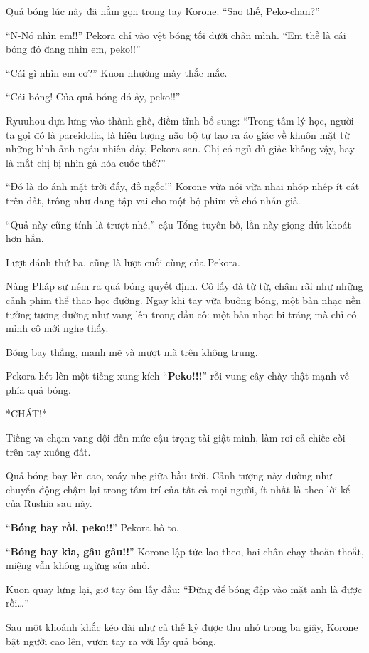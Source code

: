 \documentclass[../main.tex]{subfiles}
\begin{document}
Quả bóng lúc này đã nằm gọn trong tay Korone. ``Sao thế, Peko-chan?''

``N-Nó nhìn em!!'' Pekora chỉ vào vệt bóng tối dưới chân mình. ``Em thề là cái bóng đó đang nhìn em, peko!!''

``Cái gì nhìn em cơ?'' Kuon nhướng mày thắc mắc.

``Cái bóng! Của quả bóng đó ấy, peko!!''

Ryuuhou dựa lưng vào thành ghế, điềm tĩnh bổ sung: ``Trong tâm lý học, người ta gọi đó là pareidolia, là hiện tượng não bộ tự tạo ra ảo giác về khuôn mặt từ những hình ảnh ngẫu nhiên đấy, Pekora-san. Chị có ngủ đủ giấc không vậy, hay là mắt chị bị nhìn gà hóa cuốc thế?''

``Đó là do ánh mặt trời đấy, đồ ngốc!'' Korone vừa nói vừa nhai nhóp nhép ít cát trên đất, trông như đang tập vai cho một bộ phim về chó nhẫn giả.

``Quả này cũng tính là trượt nhé,'' cậu Tổng tuyên bố, lần này giọng dứt khoát hơn hẳn.

\ct

Lượt đánh thứ ba, cũng là lượt cuối cùng của Pekora.

Nàng Pháp sư ném ra quả bóng quyết định. Cô lấy đà từ từ, chậm rãi như những cảnh phim thể thao học đường. Ngay khi tay vừa buông bóng, một bản nhạc nền tưởng tượng dường như vang lên trong đầu cô: một bản nhạc bi tráng mà chỉ có mình cô mới nghe thấy.

Bóng bay thẳng, mạnh mẽ và mượt mà trên không trung.

Pekora hét lên một tiếng xung kích ``\textbf{Peko!!!}'' rồi vung cây chày thật mạnh về phía quả bóng.

*CHÁT!*

Tiếng va chạm vang dội đến mức cậu trọng tài giật mình, làm rơi cả chiếc còi trên tay xuống đất.

Quả bóng bay lên cao, xoáy nhẹ giữa bầu trời. Cảnh tượng này dường như chuyển động chậm lại trong tâm trí của tất cả mọi người, ít nhất là theo lời kể của Rushia sau này.

``\textbf{Bóng bay rồi, peko!!}'' Pekora hô to.

``\textbf{Bóng bay kìa, gâu gâu!!}'' Korone lập tức lao theo, hai chân chạy thoăn thoắt, miệng vẫn không ngừng sủa nhỏ.

Kuon quay lưng lại, giơ tay ôm lấy đầu: ``Đừng để bóng đập vào mặt anh là được rồi\dots''

Sau một khoảnh khắc kéo dài như cả thế kỷ được thu nhỏ trong ba giây, Korone bật người cao lên, vươn tay ra với lấy quả bóng.
\end{document}
